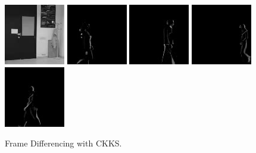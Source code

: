 \begin{subfigure}[t]{0.9\textwidth}
    \centering
    \includegraphics[scale=0.7]{figures/LASIESTA-CKKS-DIFFERENCING/frame0}
    \hfill
    \includegraphics[scale=0.7]{figures/LASIESTA-CKKS-DIFFERENCING/frame100}
    \hfill
    \includegraphics[scale=0.7]{figures/LASIESTA-CKKS-DIFFERENCING/frame190}
    \hfill
    \includegraphics[scale=0.7]{figures/LASIESTA-CKKS-DIFFERENCING/frame250}
    \hfill
    \includegraphics[scale=0.7]{figures/LASIESTA-CKKS-DIFFERENCING/frame270}
    \caption{Frame Differencing with CKKS.}
\end{subfigure}%
\\ \bigskip
